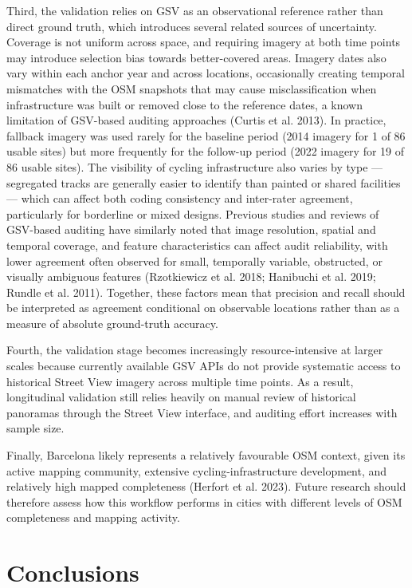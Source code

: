 \documentclass[
]{article}
\begin{document}
\color{blue}Third, the validation relies on GSV as an observational
reference rather than direct ground truth, which introduces several
related sources of uncertainty. Coverage is not uniform across space,
and requiring imagery at both time points may introduce selection bias
towards better-covered areas. Imagery dates also vary within each anchor
year and across locations, occasionally creating temporal mismatches
with the OSM snapshots that may cause misclassification when
infrastructure was built or removed close to the reference dates, a
known limitation of GSV-based auditing approaches (Curtis et al. 2013).
In practice, fallback imagery was used rarely for the baseline period
(2014 imagery for 1 of 86 usable sites) but more frequently for the
follow-up period (2022 imagery for 19 of 86 usable sites). The
visibility of cycling infrastructure also varies by type --- segregated
tracks are generally easier to identify than painted or shared
facilities --- which can affect both coding consistency and inter-rater
agreement, particularly for borderline or mixed designs. Previous
studies and reviews of GSV-based auditing have similarly noted that
image resolution, spatial and temporal coverage, and feature
characteristics can affect audit reliability, with lower agreement often
observed for small, temporally variable, obstructed, or visually
ambiguous features (Rzotkiewicz et al. 2018; Hanibuchi et al. 2019;
Rundle et al. 2011). Together, these factors mean that precision and
recall should be interpreted as agreement conditional on observable
locations rather than as a measure of absolute ground-truth
accuracy.\color{black}

\color{blue}Fourth, the validation stage becomes increasingly
resource-intensive at larger scales because currently available GSV APIs
do not provide systematic access to historical Street View imagery
across multiple time points. As a result, longitudinal validation still
relies heavily on manual review of historical panoramas through the
Street View interface, and auditing effort increases with sample
size.\color{black}

Finally, Barcelona likely represents a relatively favourable OSM
context, given its active mapping community, extensive
cycling-infrastructure development, and relatively high mapped
completeness (Herfort et al. 2023). Future research should therefore
assess how this workflow performs in cities with different levels of OSM
completeness and mapping activity.

\section{Conclusions}\label{conclusions}
\end{document}
